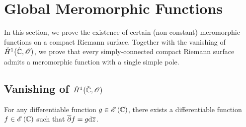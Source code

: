 \documentclass[../Moduli_Spaces_of_Riemann_Surfaces.tex]{subfiles}
\begin{document}
    \section{Global Meromorphic Functions}
    In this section, we prove the existence of certain (non-constant) meromorphic functions on a compact Riemann surface. Together with the vanishing of $\check{H}^1\big(\hat{\mathbb{C}},\mathscr{O}\big)$, we prove that every simply-connected compact Riemann surface admits a meromorphic function with a single simple pole.
    \subsection{Vanishing of $\check{H}^1\big(\hat{\mathbb{C}},\mathscr{O}\big)$}
    \begin{theorem}[Dolbeault]
        For any differentiable function $g\in\mathscr{E}\left(\mathbb{C}\right)$, there exists a differentiable function $f\in\mathscr{E}\left(\mathbb{C}\right)$ such that $\overline{\partial}f=g\mathrm{d}\overline{z}$.
    \end{theorem}
\end{document}
